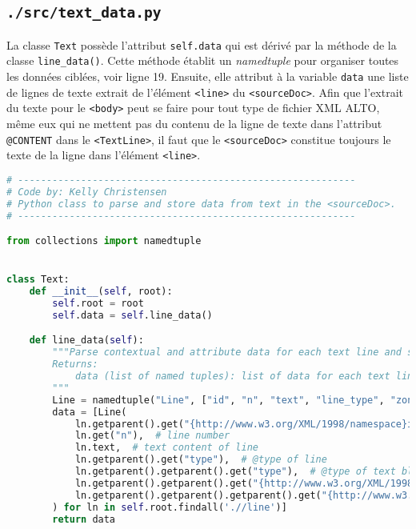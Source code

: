 \documentclass[class=article, crop=false]{standalone}
\begin{document}
\subsection{\texttt{./src/text\_data.py}}
La classe \texttt{Text} possède l'attribut \texttt{self.data} qui est dérivé par la méthode de la classe \texttt{line\_data()}. Cette méthode établit un \textit{namedtuple} pour organiser toutes les données ciblées, voir ligne 19. Ensuite, elle attribut à la variable \texttt{data} une liste de lignes de texte extrait de l'élément \texttt{<line>} du \texttt{<sourceDoc>}. Afin que l'extrait du texte pour le \texttt{<body>} peut se faire pour tout type de fichier \acrshort{XML} \acrshort{ALTO}, même eux qui ne mettent pas du contenu de la ligne de texte dans l'attribut \texttt{@CONTENT} dans le \texttt{<TextLine>}, il faut que le \texttt{<sourceDoc>} constitue toujours le texte de la ligne dans l'élément \texttt{<line>}.

\begin{lstlisting}[language=python, style=python]
# -----------------------------------------------------------
# Code by: Kelly Christensen
# Python class to parse and store data from text in the <sourceDoc>.
# -----------------------------------------------------------

from collections import namedtuple


class Text:
    def __init__(self, root):
        self.root = root
        self.data = self.line_data()

    def line_data(self):
        """Parse contextual and attribute data for each text line and store it in a named tuple.
        Returns:
            data (list of named tuples): list of data for each text line
        """ 
        Line = namedtuple("Line", ["id", "n", "text", "line_type", "zone_type", "zone_id", "page_id"])
        data = [Line(
            ln.getparent().get("{http://www.w3.org/XML/1998/namespace}id"),  # @xml:id of the line's zone
            ln.get("n"),  # line number
            ln.text,  # text content of line
            ln.getparent().get("type"),  # @type of line
            ln.getparent().getparent().get("type"),  # @type of text block zone
            ln.getparent().getparent().get("{http://www.w3.org/XML/1998/namespace}id"),  # @xml:id of text block zone
            ln.getparent().getparent().getparent().get("{http://www.w3.org/XML/1998/namespace}id"),  # @xml:id of page
        ) for ln in self.root.findall('.//line')]
        return data
        
\end{lstlisting}
\end{document}
